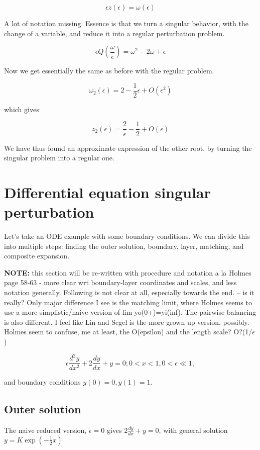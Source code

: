 \documentclass[12pt]{report}
\begin{document}
$$\epsilon z (\epsilon) = \omega (\epsilon)$$

A lot of notation missing. Essence is that we turn a singular
behavior, with the change of a variable, and reduce it into a regular
perturbation problem.

$$\epsilon Q(\frac \omega \epsilon) = \omega^2 - 2\omega + \epsilon$$

Now we get essentially the same as before with the regular problem.

$$\omega_2(\epsilon) = 2 - \frac 1 2 \epsilon + O(\epsilon^2)$$

which gives

$$z_2(\epsilon) = \frac 2 \epsilon - \frac 1 2 + O(\epsilon)$$

We have thus found an approximate expression of the other root, by
turning the singular problem into a regular one.

\chapter{Differential equation singular perturbation}

Let's take an ODE example with some boundary conditions. We can divide this into multiple steps: finding the outer solution, boundary, layer, matching, and composite expansion.

\textbf{NOTE:} this section will be re-written with procedure and
notation a la Holmes page 58-63 - more clear wrt boundary-layer
coordinates and scales, and less notation generally. Following is not
clear at all, especially towards the end. -- is it really? Only major difference I see is the matching limit, where Holmes seems to use a more simplistic/naive version of lim yo(0+)=yi(inf). The pairwise balancing is also different. I feel like Lin and Segel is the more grown up version, possibly. Holmes seem to confuse, me at least, the O(epsilon) and the length scale? O?(1/$\epsilon$)

\begin{equation}
  \epsilon \frac{d^2y}{dx^2} + 2 \frac{dy}{dx} + y = 0; 0 < x < 1, 0
  < \epsilon \ll 1,
\end{equation}

and boundary conditions $y(0)=0, y(1) =1$.

\section{Outer solution}

The naive reduced version, $\epsilon = 0$ gives $2 \frac{dy}{dx} + y = 0$, with general solution $y=K \exp(-\frac{1}{2} x)$
\end{document}
